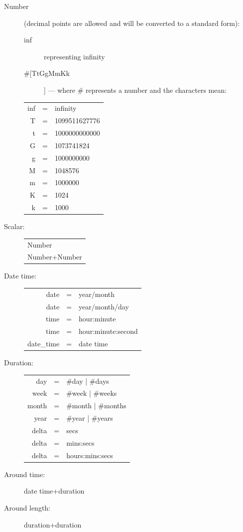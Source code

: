 \begin{description}
\item[Number] (decimal points are allowed and will be converted to a standard form):
    \begin{description}
        \item[inf] representing infinity
        \item[\#[TtGgMmKk]]  ---  where \# represents a number and the characters mean:
    \end{description}

    \begin{tabular}{rcl}
        inf&=& infinity\\
        T&=&1099511627776\\
        t&=&1000000000000\\
        G&=&1073741824\\
        g&=&1000000000\\
        M&=&1048576\\
        m&=&1000000\\
        K&=&1024\\
        k&=&1000\\
    \end{tabular}

\item[Scalar:] 

    \begin{tabular}{l}
        Number\\
        Number+Number\\
    \end{tabular}
\item[Date time:]
    \begin{tabular}{rcl}
        date&=&year/month\\
        date&=&year/month/day\\
        time&=&hour:minute\\
        time&=&hour:minute:second\\
        date\_time&=&date time\\
    \end{tabular}

  \item[Duration:]
      \begin{tabular}{rcl}
    day  &=&	\#day 	  | \#days\\
    week &=&	\#week 	  | \#weeks\\
    month&=&	\#month | \#months\\
    year &=&	\#year	  | \#years\\
    delta&=&secs\\
    delta&=&mins:secs\\
    delta&=&hours:mins:secs\\
      \end{tabular}

\item[Around time:]
    date time+duration

  \item[Around length:]
    duration+duration

\end{description}

